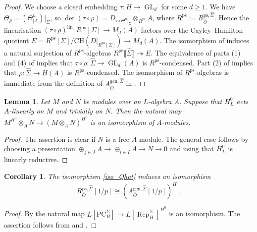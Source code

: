 \documentclass{amsart}
\newtheorem{lem}[prop]{Lemma}
\newtheorem{cor}[prop]{Corollary}
\theoremstyle{definition}
\theoremstyle{remark}
\DeclareMathOperator{\GL}{GL}
\DeclareMathOperator{\Rep}{Rep}
\newcommand{\br}[1]{\llbracket #1\rrbracket}
\newcommand{\CH}{\mathrm{CH}}
\newcommand{\gen}{\mathrm{gen}}
\newcommand{\lin}{\mathrm{lin}}
\newcommand{\PC}{\mathrm{PC}}
\newcommand{\Thetabar}{\overline{\Theta}}
\newcommand{\ps}{\mathrm{ps}}
\newcommand{\Sigmahat}{\widehat{\Sigma}}
\begin{document}
\begin{proof}  We choose a closed embedding $\tau : H \to \GL_d$ for some $d \geq 1$. We have $\Theta_{\rho} = (\Theta^u_{|A})|_\Sigma$, so $\det(\tau \circ \rho) = D_{\tau \circ \Theta^u|_\Sigma} \otimes_{R^{\ps}} A$, where $R^{\ps}:= R^{\ps, \Sigmahat}_{\Thetabar}$. 
    Hence the linearisation $(\tau \circ \rho)^{\lin} :
    R^{\ps}[\Sigma] \to M_d(A)$ factors over the Cayley--Hamilton quotient
    $E = R^{\ps}[\Sigma]/\CH(D|_{R^{\ps}[\Sigma]}) \to M_d(A)$.
    The isomorphism of  induces a natural
    surjection of $R^{\ps}$-algebras $R^{\ps}\br{\Sigmahat} \twoheadrightarrow E$. The equivalence of parts (1) and (4) of \cite[Lemma 5.2]{defG} 
    implies that $\tau\circ \rho: 
    \Sigmahat \rightarrow \GL_d(A)$ is $R^{\ps}$-condensed. Part (2) of \cite[Lemma 4.16]{defG} implies that $\rho: \Sigmahat\rightarrow H(A)$ is $R^{\ps}$-condensed.  The isomorphism of $R^{\ps}$-algebras is immediate from the definition of $A^{\gen, \Sigmahat}_{\Thetabar}$ in . 
\end{proof}




\begin{lem}\label{tensor_inv2} Let  $M$ and $N$ be modules over  an $L$-algebra $A$. 
Suppose that $H^0_L$ acts $A$-linearly on $M$ and trivially on $N$. 
Then the natural map $ M^{H^{0}}\otimes_A N\rightarrow (M\otimes_A N)^{H^0}$ is an isomorphism of $A$-modules. 
\end{lem} 
\begin{proof} The assertion is clear if $N$ is a free $A$-module. 
The general case follows by choosing a presentation 
$\oplus_{j\in J} A\rightarrow \oplus_{i\in I} A\rightarrow N\rightarrow 0$ and using that $H^0_L$ is linearly reductive.
\end{proof} 

\begin{cor}\label{cor_iso_Qhat} The isomorphism \eqref{iso_Qhat} induces an isomorphism 
\begin{equation} 
R^{\ps, \Sigmahat}_{\Thetabar}[1/p] \cong (A^{\gen, \Sigmahat}_{\Thetabar}[1/p])^{H^0}.
\end{equation}
\end{cor} 
\begin{proof}  By 
the natural map $L[\PC^\Sigma_H] \rightarrow L[\Rep^\Sigma_H]^{H^0}$ is an isomorphism. The assertion follows from  and .
\end{proof} 
\end{document}
